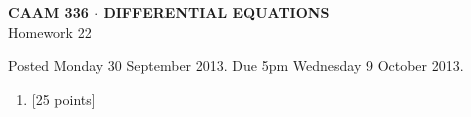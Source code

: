 \documentclass[10pt]{article}
\begin{document}
\vspace*{-5em}
\begin{center}
\large \textsf{\textbf{CAAM 336 $\cdot$ DIFFERENTIAL EQUATIONS}\\[0.5em]
Homework 22 }
\end{center}

Posted Monday 30 September 2013.  Due 5pm Wednesday 9 October 2013.

\begin{enumerate}\addtocounter{enumi}{21}
\item {[25 points]}  
\end{enumerate}
\end{document}
